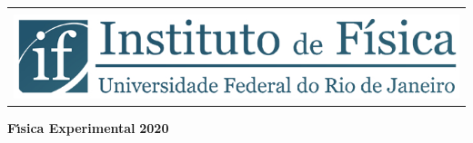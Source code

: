 \begin{titlepage}

\begin{center}
\begin{tabular}{@{}l}
\mbox{}\\[1mm]       
\hspace{0.8cm}
\includegraphics[width=14cm]{fig/logoiftop.jpg}
\end{tabular}%
%


\vskip 3.5cm
{\bf  \Huge F\'\i sica Experimental}
\vskip 0.2cm
\vskip 7cm
{\bf \Large   2020}

\end{center}



\end{titlepage}


